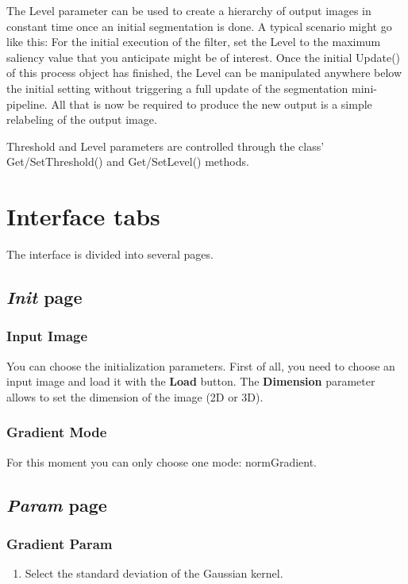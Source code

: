 \documentclass{article}
\begin{document}
The Level parameter can be used to create a hierarchy of output images in constant time once an initial segmentation is done. A typical scenario might go like this: For the initial execution of the filter, set the Level to the maximum saliency value that you anticipate might be of interest. Once the initial Update() of this process object has finished, the Level can be manipulated anywhere below the initial setting without triggering a full update of the segmentation mini-pipeline. All that is now be required to produce the new output is a simple relabeling of the output image.


Threshold and Level parameters are controlled through the class' Get/SetThreshold() and Get/SetLevel() methods.


\section{Interface tabs}

The interface is divided into several pages.

\subsection{\emph{Init} page}

\subsubsection{Input Image}
You can choose the initialization parameters.
First of all, you need to choose an input image and load it with the {\bf Load} button.
The {\bf Dimension} parameter allows to set the dimension of the image (2D or 3D).

\subsubsection{Gradient Mode}
For this moment you can only choose one mode: normGradient.

\subsection{\emph{Param} page}
\subsubsection{Gradient Param}
\begin{enumerate}
 \item Select the standard deviation of the Gaussian kernel.
\end{enumerate}
\end{document}
